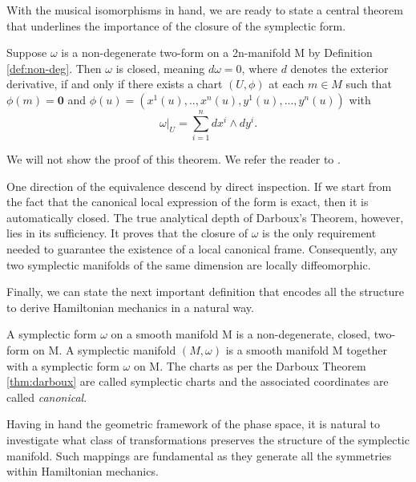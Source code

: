 \noindent With the musical isomorphisms in hand, we are ready to state a central theorem that underlines the importance of the closure of the symplectic form.

\begin{theorem}[Darboux]\label{thm:darboux}
	Suppose $\omega$ is a non-degenerate two-form on a 2n-manifold M by Definition \ref{def:non-deg}. Then $\omega$ is closed, meaning $d \omega = 0$, where $d$ denotes the exterior derivative, if and only if there exists a chart $(U, \phi)$ at each $m \in M$ such that $\phi(m) = \boldsymbol{0}$ and $\phi(u) = (x^1(u),..,x^n(u), y^1(u),...,y^n(u))$ with
	\[
		\omega|_U = \sum_{i=1}^n dx^i \wedge dy^i.
	\]
\end{theorem}

\noindent We will not show the proof of this theorem. We refer the reader to \cite[Theorem 3.2.2]{abrahamFoundationsMechanics2008}.

\begin{remark}\label{rem:darboux-consequences}
	One direction of the equivalence descend by direct inspection. If we start from the fact that the canonical local expression of the form is exact, then it is automatically closed. The true analytical depth of Darboux's Theorem, however, lies in its sufficiency. It proves that the closure of $\omega$ is the only requirement needed to guarantee the existence of a local canonical frame. Consequently, any two symplectic manifolds of the same dimension are locally diffeomorphic.
\end{remark}

\noindent Finally, we can state the next important definition that encodes all the structure to derive Hamiltonian mechanics in a natural way.

\begin{definition}\label{def:sympl-man}
	A symplectic form $\omega$ on a smooth manifold M is a non-degenerate, closed, two-form on M. A symplectic manifold $(M, \omega)$ is a smooth manifold M together with a symplectic form $\omega$ on M. The charts as per the Darboux Theorem \ref{thm:darboux} are called symplectic charts and the associated coordinates are called \emph{canonical}.
\end{definition}

Having in hand the geometric framework of the phase space, it is natural to investigate what class of transformations preserves the structure of the symplectic manifold. Such mappings are fundamental as they generate all the symmetries within Hamiltonian mechanics. 

